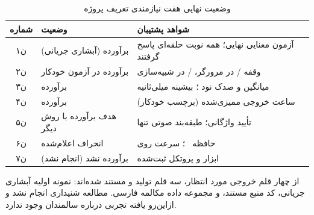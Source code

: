 \begin{table}[ht]
\centering
\caption{وضعیت نهایی هفت نیازمندی تعریف پروژه}
\label{tab:req-status}
\small
\begin{tabular}{cL{4.0cm}L{5.6cm}}
\toprule
\textbf{شماره} & \textbf{وضعیت} & \textbf{شواهد پشتیبان} \\
\midrule
ن۱ & برآورده (آبشاری جریانی) & آزمون معنایی نهایی؛ همه  نوبت حلقه‌ای پاسخ گرفتند \\
ن۲ & برآورده در آزمون خودکار & وقفه / در مرورگر، / در شبیه‌سازی \\
ن۳ & برآورده & میانگین  و صدک نود ؛ بیشینه  میلی‌ثانیه \\
ن۴ & برآورده &  ساعت خروجی ممیزی‌شده (برچسب خودکار) \\
ن۵ & هدف برآورده با روش دیگر & تأیید واژگانی؛ طبقه‌بند صوتی تنها  \\
ن۶ & انحراف اعلام‌شده & حافظه ~؛ سرعت روی  \\
ن۷ & برآورده نشد (انجام نشد) & ابزار و پروتکل ثبت‌شده \\
\bottomrule
\end{tabular}
\end{table}


از چهار قلم خروجی مورد انتظار، سه قلم تولید و مستند شده‌اند: نمونه اولیه
آبشاری جریانی، کد منبع مستند، و مجموعه داده مکالمه فارسی. مطالعه شنیداری
انجام نشد و ازاین‌رو یافته تجربی درباره سالمندان وجود ندارد.
